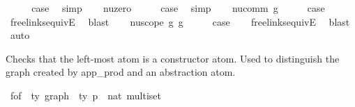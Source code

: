 \begin{isabellebody}
\ \ \isamarkupfalse%
\ \isamarkupfalse%
\ {\isacharquery}{\kern0pt}case\ \isamarkupfalse%
\ simp\isanewline
{}\isamarkupfalse%
\isanewline
\ \ \isamarkupfalse%
\ {\isacharparenleft}{\kern0pt}nu{\isacharunderscore}{\kern0pt}zero{\isacharparenright}{\kern0pt}\isanewline
\ \ \isamarkupfalse%
\ \isamarkupfalse%
\ {\isacharquery}{\kern0pt}case\ \isamarkupfalse%
\ simp\isanewline
{}\isamarkupfalse%
\isanewline
\ \ \isamarkupfalse%
\ {\isacharparenleft}{\kern0pt}nu{\isacharunderscore}{\kern0pt}comm\ g{\isacharparenright}{\kern0pt}\isanewline
\ \ \isamarkupfalse%
\ \isamarkupfalse%
\ {\isacharquery}{\kern0pt}case\isanewline
\ \ \isamarkupfalse%
\ freelinks{\isacharunderscore}{\kern0pt}equiv{\isacharunderscore}{\kern0pt}E{}\ \isamarkupfalse%
\ blast\isanewline
{}\isamarkupfalse%
\isanewline
\ \ \isamarkupfalse%
\ {\isacharparenleft}{\kern0pt}nu{\isacharunderscore}{\kern0pt}scope\ g{}\ g{}{\isacharparenright}{\kern0pt}\isanewline
\ \ \isamarkupfalse%
\ \isamarkupfalse%
\ {\isacharquery}{\kern0pt}case\isanewline
\ \ \isamarkupfalse%
\ freelinks{\isacharunderscore}{\kern0pt}equiv{\isacharunderscore}{\kern0pt}E{}{}\ \isamarkupfalse%
\ blast\isanewline
{}\isamarkupfalse%
\ auto%
\endisatagproof
{\isafoldproof}%
%
\isadelimproof
%
\endisadelimproof
%
\isadelimdocument
%
\endisadelimdocument
%
\isatagdocument
%
\isamarkuptrue%
%
\endisatagdocument
{\isafolddocument}%
%
\isadelimdocument
%
\endisadelimdocument
%
\begin{isamarkuptext}%
Checks that the left-most atom is a constructor atom.
Used to distinguish the graph created by app\_prod and an abstraction atom.%
\end{isamarkuptext}\isamarkuptrue%
\isamarkupfalse%
\ f{\isacharunderscore}{\kern0pt}of\ {\isacharcolon}{\kern0pt}{\isacharcolon}{\kern0pt}\ {\isachardoublequoteopen}{\isacharprime}{\kern0pt}ty\ graph\ {\isacharequal}{\kern0pt}{\isachargreater}{\kern0pt}\ {\isacharparenleft}{\kern0pt}{\isacharprime}{\kern0pt}ty\ p\ {\isacharasterisk}{\kern0pt}\ nat{\isacharparenright}{\kern0pt}\ multiset{\isachardoublequoteclose}\isanewline

\end{isabellebody}
